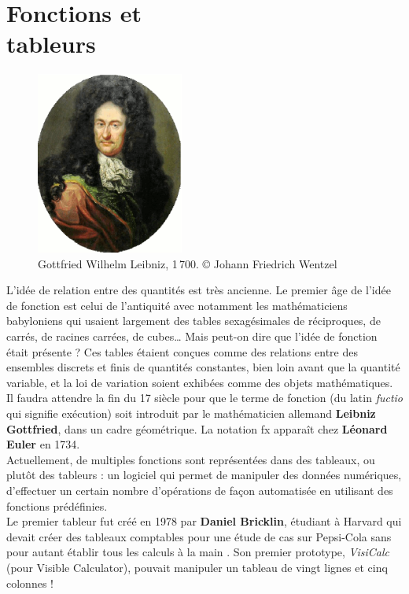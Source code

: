 \chapter{Fonctions et\\tableurs} \label{D5}

\bigskip

\begin{figure}[h]
   \centering
      \includegraphics[height=6cm]{Organisation_gestion_donnees/Images/D5_intro_Leibniz}
   \caption{Gottfried Wilhelm Leibniz, 1\,700. © Johann Friedrich Wentzel}
\end{figure}

\begin{prerequis}
  L'idée de relation entre des quantités est très ancienne. Le premier âge de l'idée de fonction est celui de l'antiquité avec notamment les mathématiciens babyloniens qui usaient largement des tables sexagésimales de réciproques, de carrés, de racines carrées, de cubes\dots{} Mais peut-on dire que l'idée de fonction était présente ? Ces tables étaient conçues comme des relations entre des ensembles discrets et finis de quantités constantes, bien loin avant que la quantité variable, et la loi de variation soient exhibées comme des objets mathématiques. \\
   Il faudra attendre la fin du 17 siècle pour que le terme de fonction (du latin {\it fuctio} qui signifie exécution) soit introduit par le mathématicien allemand {\bf Leibniz Gottfried}, dans un cadre géométrique. La notation fx apparaît chez {\bf Léonard Euler} en 1734. \\   
   Actuellement, de multiples fonctions sont représentées dans des tableaux, ou plutôt des tableurs : un logiciel qui permet de manipuler des données numériques, d'effectuer un certain nombre d'opérations de façon automatisée en utilisant des fonctions prédéfinies. \\
   Le premier tableur fut créé en 1978 par {\bf Daniel Bricklin}, étudiant à Harvard qui devait créer des tableaux comptables pour une étude de cas sur Pepsi-Cola sans pour autant établir tous les calculs \og à la main \fg. Son premier prototype, {\it VisiCalc} (pour Visible Calculator), pouvait manipuler un tableau de vingt lignes et cinq colonnes !
\end{prerequis}


